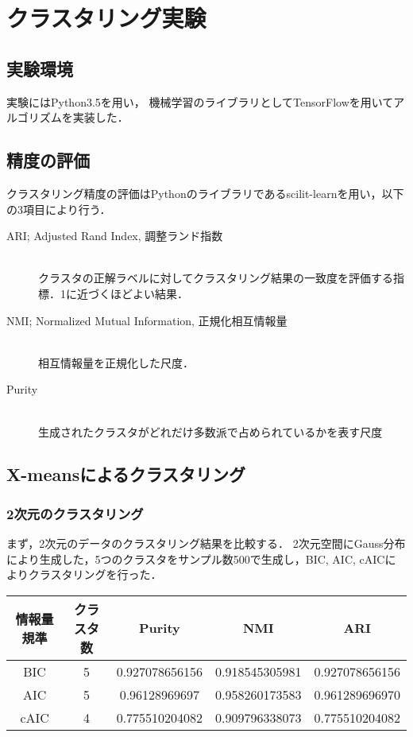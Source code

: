 \section{クラスタリング実験}

\subsection{実験環境}
実験にはPython3.5を用い，
機械学習のライブラリとしてTensorFlowを用いてアルゴリズムを実装した．

\subsection{精度の評価}
クラスタリング精度の評価はPythonのライブラリであるscilit-learnを用い，以下の3項目により行う．
\begin{description}
  \item[ARI; Adjusted Rand Index, 調整ランド指数]~\\
    クラスタの正解ラベルに対してクラスタリング結果の一致度を評価する指標．1に近づくほどよい結果．
  \item[NMI; Normalized Mutual Information, 正規化相互情報量]~\\
    相互情報量を正規化した尺度．
  \item[Purity]~\\
    生成されたクラスタがどれだけ多数派で占められているかを表す尺度
\end{description}

\subsection{X-meansによるクラスタリング}
\subsubsection{2次元のクラスタリング}

まず，2次元のデータのクラスタリング結果を比較する．
2次元空間にGauss分布により生成した，5つのクラスタをサンプル数500で生成し，BIC, AIC, cAICによりクラスタリングを行った．

\begin{table}[htb]
  \centering
  \begin{tabular}{|c|c|c|c|c|} \hline
  情報量規準 & クラスタ数 & Purity & NMI & ARI\\\hline
  BIC & 5 & 0.927078656156 & 0.918545305981 & 0.927078656156\\
  AIC & 5 & 0.96128969697 & 0.958260173583 & 0.961289696970\\
  cAIC & 4 & 0.775510204082 & 0.909796338073 & 0.775510204082\\\hline

  \end{tabular}
\end{table}

